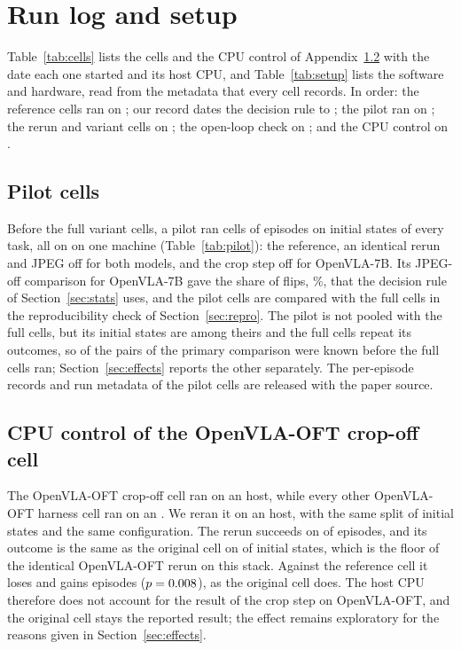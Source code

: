 \section{Run log and setup}
\label{app:runlog}

Table~\ref{tab:cells} lists the \NCells{} cells and the CPU control of Appendix~\ref{app:cpucontrol} with the date each one started and its host CPU, and Table~\ref{tab:setup} lists the software and hardware, read from the metadata that every cell records. In order: the reference cells ran on \RefDates; our record dates the decision rule to \RuleDate; the pilot ran on \PilotDate; the rerun and variant cells on \VariantDates; the open-loop check on \OlDates; and the CPU control on \CpuCtrlDates.




\subsection{Pilot cells}
\label{app:pilot}

Before the full variant cells, a pilot ran \PilotCells{} cells of \PilotPairs{} episodes on initial states \SplitA{} of every task, all on \PilotDate{} on one machine (Table~\ref{tab:pilot}): the reference, an identical rerun and JPEG off for both models, and the crop step off for OpenVLA-7B. Its JPEG-off comparison for OpenVLA-7B gave the share of flips, \PilotDisc\%, that the decision rule of Section~\ref{sec:stats} uses, and the pilot cells are compared with the full cells in the reproducibility check of Section~\ref{sec:repro}. The pilot is not pooled with the full cells, but its initial states are among theirs and the full cells repeat its outcomes, so \PilotPairs{} of the \NPairs{} pairs of the primary comparison were known before the full cells ran; Section~\ref{sec:effects} reports the other \OutPairs{} separately. The per-episode records and run metadata of the pilot cells are released with the paper source.



\subsection{CPU control of the OpenVLA-OFT crop-off cell}
\label{app:cpucontrol}

The OpenVLA-OFT crop-off cell ran on an \CpuOftCrop{} host, while every other OpenVLA-OFT harness cell ran on an \CpuMain. We reran it on an \CpuCtrlCpu{} host, with the same split of initial states and the same configuration. The rerun succeeds on \CpuCtrlK{} of \NPairs{} episodes, and its outcome is the same as the original cell on \CpuCtrlSame{} of \NPairs{} initial states, which is the floor of the identical OpenVLA-OFT rerun on this stack. Against the reference cell it loses \CpuCtrlLost{} and gains \CpuCtrlGained{} episodes ($p = 0.008$), as the original cell does. The host CPU therefore does not account for the result of the crop step on OpenVLA-OFT, and the original cell stays the reported result; the effect remains exploratory for the reasons given in Section~\ref{sec:effects}.\HookCpuAppendix{}

